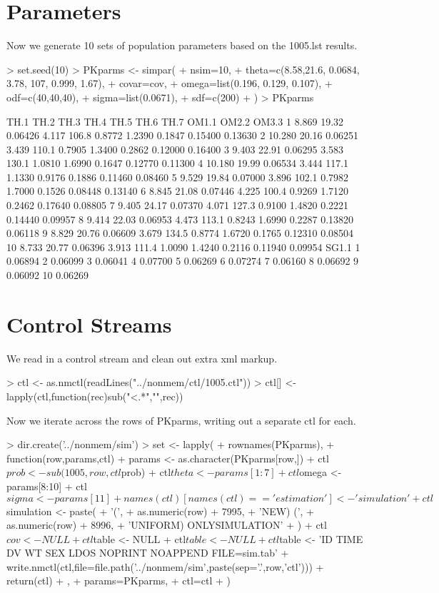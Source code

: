 \section{Parameters}
Now we generate 10 sets of population parameters based on the 1005.lst results.
\begin{Schunk}
\begin{Sinput}
> set.seed(10)
> PKparms <- simpar(
+     nsim=10,
+     theta=c(8.58,21.6, 0.0684, 3.78, 107, 0.999, 1.67),
+     covar=cov,
+     omega=list(0.196, 0.129, 0.107),
+     odf=c(40,40,40),
+     sigma=list(0.0671),
+     sdf=c(200)
+ )
> PKparms
\end{Sinput}
\begin{Soutput}
     TH.1  TH.2    TH.3  TH.4  TH.5   TH.6   TH.7  OM1.1   OM2.2   OM3.3
1   8.869 19.32 0.06426 4.117 106.8 0.8772 1.2390 0.1847 0.15400 0.13630
2  10.280 20.16 0.06251 3.439 110.1 0.7905 1.3400 0.2862 0.12000 0.16400
3   9.403 22.91 0.06295 3.583 130.1 1.0810 1.6990 0.1647 0.12770 0.11300
4  10.180 19.99 0.06534 3.444 117.1 1.1330 0.9176 0.1886 0.11460 0.08460
5   9.529 19.84 0.07000 3.896 102.1 0.7982 1.7000 0.1526 0.08448 0.13140
6   8.845 21.08 0.07446 4.225 100.4 0.9269 1.7120 0.2462 0.17640 0.08805
7   9.405 24.17 0.07370 4.071 127.3 0.9100 1.4820 0.2221 0.14440 0.09957
8   9.414 22.03 0.06953 4.473 113.1 0.8243 1.6990 0.2287 0.13820 0.06118
9   8.829 20.76 0.06609 3.679 134.5 0.8774 1.6720 0.1765 0.12310 0.08504
10  8.733 20.77 0.06396 3.913 111.4 1.0090 1.4240 0.2116 0.11940 0.09954
     SG1.1
1  0.06894
2  0.06099
3  0.06041
4  0.07700
5  0.06269
6  0.07274
7  0.06160
8  0.06692
9  0.06092
10 0.06269
\end{Soutput}
\end{Schunk}
\section{Control Streams}
We read in a control stream and clean out extra xml markup.
\begin{Schunk}
\begin{Sinput}
> ctl <- as.nmctl(readLines("../nonmem/ctl/1005.ctl"))
> ctl[] <- lapply(ctl,function(rec)sub("<.*","",rec))
\end{Sinput}
\end{Schunk}
Now we iterate across the rows of PKparms, writing out a separate ctl for each.
\begin{Schunk}
\begin{Sinput}
> dir.create('../nonmem/sim')
> set <- lapply(
+ 	rownames(PKparms),
+ 	function(row,params,ctl){
+ 		params <- as.character(PKparms[row,])
+ 		ctl$prob <- sub(1005,row,ctl$prob)
+ 		ctl$theta <- params[1:7]
+ 		ctl$omega <- params[8:10]
+ 		ctl$sigma <- params[11]
+ 		names(ctl)[names(ctl)=='estimation'] <- 'simulation'
+ 		ctl$simulation <- paste(
+ 			'(',
+ 			as.numeric(row) + 7995,
+ 			'NEW) (',
+ 			as.numeric(row) + 8996,
+ 			'UNIFORM) ONLYSIMULATION'
+ 		)
+ 		ctl$cov <- NULL
+ 		ctl$table <- NULL
+ 		ctl$table <- NULL
+ 		ctl$table <- 'ID TIME DV WT SEX LDOS NOPRINT NOAPPEND FILE=sim.tab'
+ 		write.nmctl(ctl,file=file.path('../nonmem/sim',paste(sep='.',row,'ctl')))
+ 		return(ctl)		
+ 	},
+ 	params=PKparms,
+ 	ctl=ctl
+ )
\end{Sinput}
\end{Schunk}
